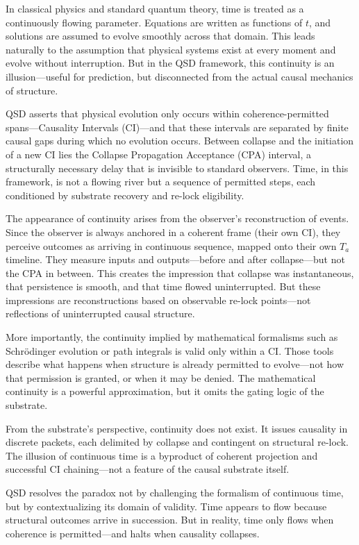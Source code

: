 \documentclass[preprints,article,submit,pdftex,moreauthors]{Definitions/mdpi}
\begin{document}
In classical physics and standard quantum theory, time is treated as a continuously flowing parameter. Equations are written as functions of \( t \), and solutions are assumed to evolve smoothly across that domain. This leads naturally to the assumption that physical systems exist at every moment and evolve without interruption. But in the QSD framework, this continuity is an illusion—useful for prediction, but disconnected from the actual causal mechanics of structure.

QSD asserts that physical evolution only occurs within coherence-permitted spans—Causality Intervals (CI)—and that these intervals are separated by finite causal gaps during which no evolution occurs. Between collapse and the initiation of a new CI lies the Collapse Propagation Acceptance (CPA) interval, a structurally necessary delay that is invisible to standard observers. Time, in this framework, is not a flowing river but a sequence of permitted steps, each conditioned by substrate recovery and re-lock eligibility.

The appearance of continuity arises from the observer’s reconstruction of events. Since the observer is always anchored in a coherent frame (their own CI), they perceive outcomes as arriving in continuous sequence, mapped onto their own \( T_a \) timeline. They measure inputs and outputs—before and after collapse—but not the CPA in between. This creates the impression that collapse was instantaneous, that persistence is smooth, and that time flowed uninterrupted. But these impressions are reconstructions based on observable re-lock points—not reflections of uninterrupted causal structure.

More importantly, the continuity implied by mathematical formalisms such as Schrödinger evolution or path integrals is valid only within a CI. Those tools describe what happens when structure is already permitted to evolve—not how that permission is granted, or when it may be denied. The mathematical continuity is a powerful approximation, but it omits the gating logic of the substrate.

From the substrate’s perspective, continuity does not exist. It issues causality in discrete packets, each delimited by collapse and contingent on structural re-lock. The illusion of continuous time is a byproduct of coherent projection and successful CI chaining—not a feature of the causal substrate itself.

QSD resolves the paradox not by challenging the formalism of continuous time, but by contextualizing its domain of validity. Time appears to flow because structural outcomes arrive in succession. But in reality, time only flows when coherence is permitted—and halts when causality collapses.
\end{document}
